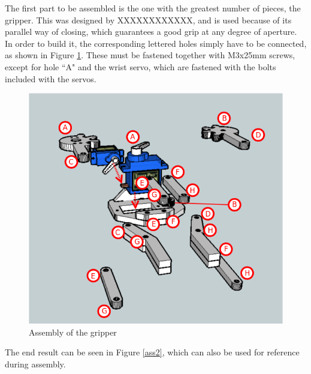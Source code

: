 The first part to be assembled is the one with the greatest number of pieces, the gripper. This was designed by XXXXXXXXXXXX, and is used because of its parallel way of closing, which guarantees a good grip at any degree of aperture. In order to build it, the corresponding lettered holes simply have to be connected, as shown in Figure \ref{ass1}. These must be fastened together with M3x25mm screws, except for hole ``A" and the wrist servo, which are fastened with the bolts included with the servos.\\

	\begin{figure}[H]
			\centering
			\includegraphics[scale=0.7]{images/Assembly/1-2.png}
			\caption{Assembly of the gripper }
			\label{ass1}
	\end{figure}
	\bigskip

The end result can be seen in Figure \ref{ass2}, which can also be used for reference during assembly.\\



